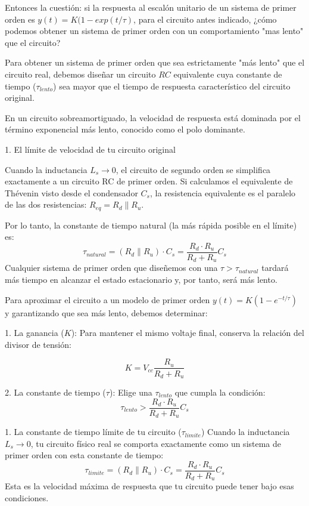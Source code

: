 \documentclass[11pt, a4paper]{article}
\theoremstyle{definition}
\theoremstyle{plain}
\theoremstyle{plain}
\theoremstyle{remark}
\theoremstyle{remark}
\theoremstyle{remark}
\begin{document}
Entonces la cuestión: si la respuesta al escalón unitario de un sistema de primer orden es $y(t) = K (1 -  exp (t / \tau)$, para el circuito antes indicado, ¿cómo podemos obtener un sistema de primer orden con un comportamiento "mas lento" que el circuito?


Para obtener un sistema de primer orden que sea estrictamente "más lento" que el circuito real, debemos diseñar un circuito $RC$ equivalente cuya constante de tiempo ($\tau_{lento}$) sea mayor que el tiempo de respuesta característico del circuito original.

En un circuito sobreamortiguado, la velocidad de respuesta está dominada por el término exponencial más lento, conocido como el polo dominante.


1. El límite de velocidad de tu circuito original

Cuando la inductancia $L_s \to 0$, el circuito de segundo orden se simplifica exactamente a un circuito RC de primer orden. Si calculamos el equivalente de Thévenin visto desde el condensador $C_s$, la resistencia equivalente es el paralelo de las dos resistencias: $R_{eq} = R_d \parallel R_u$.

Por lo tanto, la constante de tiempo natural (la más rápida posible en el límite) es:
$$\tau_{natural} = (R_d \parallel R_u) \cdot C_s = \frac{R_d \cdot R_u}{R_d + R_u} C_s$$ 
Cualquier sistema de primer orden que diseñemos con una $\tau > \tau_{natural}$ tardará más tiempo en alcanzar el estado estacionario y, por tanto, será más lento.


Para aproximar el circuito a un modelo de primer orden $y(t) = K(1 - e^{-t/\tau})$ y garantizando que sea más lento, debemos determinar:

1. La ganancia ($K$): Para mantener el mismo voltaje final, conserva la relación del divisor de tensión:

$$K = V_{cc} \frac{R_u}{R_d + R_u}$$ 

2. La constante de tiempo ($\tau$): Elige una $\tau_{lento}$ que cumpla la condición:
$$\tau_{lento} > \frac{R_d \cdot R_u}{R_d + R_u} C_s$$ 



1. La constante de tiempo límite de tu circuito ($\tau_{limite}$)
Cuando la inductancia $L_s \to 0$, tu circuito físico real se comporta exactamente como un sistema de primer orden con esta constante de tiempo:
$$\tau_{limite} = (R_d \parallel R_u) \cdot C_s = \frac{R_d \cdot R_u}{R_d + R_u} C_s$$ 
Esta es la velocidad máxima de respuesta que tu circuito puede tener bajo esas condiciones.
\end{document}
